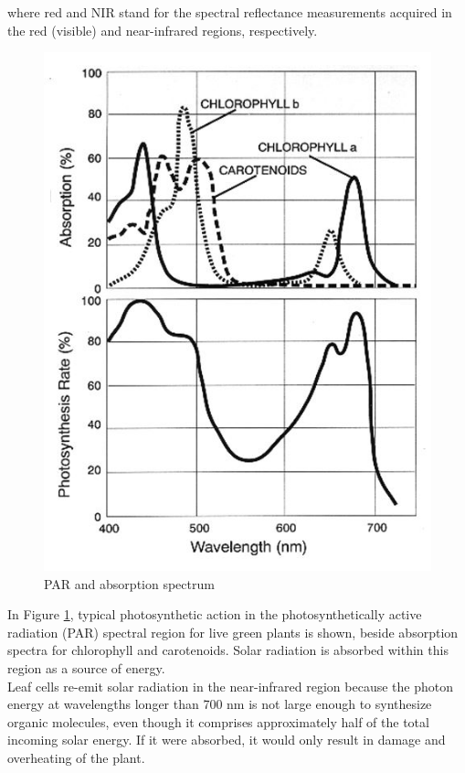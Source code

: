 where red and NIR stand for the spectral reflectance measurements acquired in the red (visible) and near-infrared regions, respectively.

\begin{figure}[H]
\centering
\includegraphics[scale=0.5]{images/chlorophyll.jpg}
\centering
\caption{PAR and absorption spectrum \cite{ndvi_wiki}}
\label{fig:chlorophyll}
\end{figure}

In Figure \ref{fig:chlorophyll}, typical photosynthetic action in the photosynthetically active radiation (PAR) spectral region for live green plants is shown, beside absorption spectra for chlorophyll and carotenoids. Solar radiation is absorbed within this region as a source of energy. \\

Leaf cells re-emit solar radiation in the near-infrared region because the photon energy at wavelengths longer than 700 nm is not large enough to synthesize organic molecules, even though it comprises approximately half of the total incoming solar energy. If it were absorbed, it would only result in damage and overheating of the plant.\\

